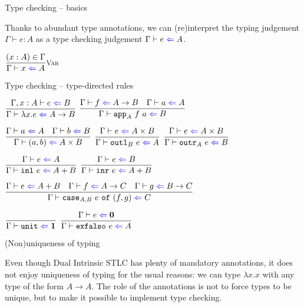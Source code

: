 \documentclass{beamer}
\newcommand{\Fun}[2]{#1 \to #2}
\newcommand{\Prod}[2]{#1 \times #2}
\newcommand{\Sum}[2]{#1 + #2}
\newcommand{\Unit}{\textbf{1}}
\newcommand{\Empty}{\textbf{0}}
\newcommand{\fun}[2]{\lambda #1. #2}
\newcommand{\pair}[2]{(#1, #2)}
\newcommand{\inl}[1]{\texttt{inl}\ #1}
\newcommand{\inr}[1]{\texttt{inr}\ #1}
\newcommand{\unit}{\texttt{unit}}
\newcommand{\exfalso}[1]{\texttt{exfalso}\ #1}
\newcommand{\fulltyping}[3]{#1 \vdash #2 : #3}
\newcommand{\rulename}[1]{\textsc{\footnotesize{#1}}}
\newcommand{\infrule}[3][]{\displaystyle \frac{#2}{#3} \rulename{#1}}
\newcommand{\extend}[3]{#1, #2 : #3}
\newcommand{\sidecond}[1]{#1}
\begin{document}
\begin{frame}{Type checking -- basics}

Thanks to abundant type annotations, we can (re)interpret the typing judgement $\fulltyping{\Gamma}{e}{A}$ as a type checking judgement $\fullcheck{\Gamma}{e}{A}$.

\vspace{2em}

\begin{center}
  $\infrule[Var]{\sidecond{(x : A) \in \Gamma}}{\check{x}{A}}$
\end{center}

\end{frame}

\begin{frame}{Type checking -- type-directed rules}

\begin{center}
  $\infrule{\fullcheck{\extend{\Gamma}{x}{A}}{e}{B}}{\check{\fun{x}{e}}{\Fun{A}{B}}}$ \enspace
  $\infrule{\check{f}{\Fun{A}{B}} \quad \check{a}{A}}{\check{\iapp{A}{f}{a}}{B}}$

  \vspace{2em}

  $\infrule{\check{a}{A} \quad \check{b}{B}}{\check{\pair{a}{b}}{\Prod{A}{B}}}$ \enspace
  $\infrule{\check{e}{\Prod{A}{B}}}{\check{\ioutl{B}{e}}{A}}$ \enspace
  $\infrule{\check{e}{\Prod{A}{B}}}{\check{\ioutr{A}{e}}{B}}$

  \vspace{2em}

  $\infrule{\check{e}{A}}{\check{\inl{e}}{\Sum{A}{B}}}$ \quad
  $\infrule{\check{e}{B}}{\check{\inr{e}}{\Sum{A}{B}}}$

  \vspace{2em}

  $\infrule{\check{e}{\Sum{A}{B}} \quad \check{f}{\Fun{A}{C}} \quad \check{g}{\Fun{B}{C}}}{\check{\icase{A}{B}{e}{f}{g}}{C}}$

  \vspace{2em}

  $\infrule{}{\check{\unit}{\Unit}}$ \quad
  $\infrule{\check{e}{\Empty}}{\check{\exfalso{e}}{A}}$
\end{center}

\end{frame}

\begin{frame}{(Non)uniqueness of typing}

Even though Dual Intrinsic STLC has plenty of mandatory annotations, it does not enjoy uniqueness of typing for the usual reasons: we can type $\fun{x}{x}$ with any type of the form $\Fun{A}{A}$. The role of the annotations is not to force types to be unique, but to make it possible to implement type checking.

\end{frame}
\end{document}
